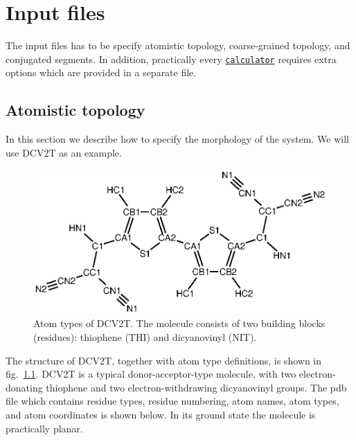 \chapter{Input files}
\label{sec:mapping}

\newcommand{\ctpmap}{\hyperref[prog:ctp_map]{\texttt{ctp\_map}}\xspace}
\newcommand{\dumptraj}{\hyperref[calc:dumptraj]{\texttt{dumptraj}}\xspace}
\newcommand{\calculator}{\hyperref[sec:alculators]{\texttt{calculator}}\xspace}

The \xml input files has to be specify atomistic topology, coarse-grained topology, and conjugated segments. In addition, practically every \calculator requires extra options which are provided in a separate \xml file.

\section{Atomistic topology}
\label{sec:atomistic}
In this section we describe how to specify the morphology of the system. We will use DCV2T as an example.

\begin{figure}
\centering
\includegraphics[width=0.9\linewidth]{./fig/chemical_structure/dcv2t_atom_types}
\caption{\small Atom types of DCV2T. The molecule consists of two building blocks (residues): thiophene (THI) and dicyanovinyl (NIT). }
\label{fig:dcv2t_at}
\end{figure}

The structure of DCV2T, together with atom type definitions, is shown in fig.~\ref{fig:dcv2t_at}. DCV2T is a typical donor-acceptor-type molecule, with two electron-donating thiophene and two electron-withdrawing dicyanovinyl groups. The pdb file which contains residue types, residue numbering, atom names, atom types, and atom coordinates is shown below. In its ground state the molecule is practically planar. 

